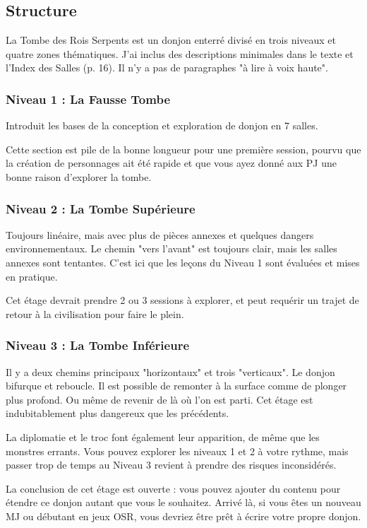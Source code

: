 \subsection{Structure}
La Tombe des Rois Serpents est un donjon enterré divisé en trois niveaux et quatre zones thématiques. 
J'ai inclus des descriptions minimales dans le texte et l'Index des Salles (p. 16). 
Il n'y a pas de paragraphes "à lire à voix haute".

\subsubsection{Niveau 1 : La Fausse Tombe}
Introduit les bases de la conception et exploration de donjon en 7 salles. 

Cette section est pile de la bonne longueur pour une première session, pourvu que la création de personnages ait été rapide et que vous ayez donné aux PJ une bonne raison d'explorer la tombe.

\subsubsection{Niveau 2 : La Tombe Supérieure}
Toujours linéaire, mais avec plus de pièces annexes et quelques dangers environnementaux.
Le chemin "vers l'avant" est toujours clair, mais les salles annexes sont tentantes. 
C'est ici que les leçons du Niveau 1 sont évaluées et mises en pratique.

Cet étage devrait prendre 2 ou 3 sessions à explorer, et peut requérir un trajet de retour à la civilisation pour faire le plein.

\subsubsection{Niveau 3 : La Tombe Inférieure}
Il y a deux chemins principaux "horizontaux" et trois "verticaux". 
Le donjon bifurque et reboucle. 
Il est possible de remonter à la surface comme de plonger plus profond. 
Ou même de revenir de là où l'on est parti. 
Cet étage est indubitablement plus dangereux que les précédents. 

La diplomatie et le troc font également leur apparition, de même que les monstres errants. 
Vous pouvez explorer les niveaux 1 et 2 à votre rythme, mais passer trop de temps au Niveau 3 revient à prendre des risques inconsidérés.

La conclusion de cet étage est ouverte : vous pouvez ajouter du contenu pour étendre ce donjon autant que vous le souhaitez. 
Arrivé là, si vous êtes un nouveau MJ ou débutant en jeux OSR, vous devriez être prêt à écrire votre propre donjon.

